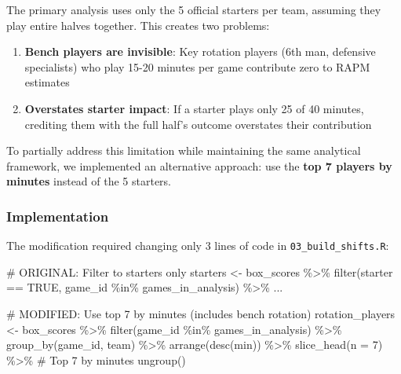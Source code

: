 \documentclass[
  letterpaper,
  DIV=11,
  numbers=noendperiod]{scrartcl}
\newenvironment{Shaded}{\begin{snugshade}}{\end{snugshade}}
\newcommand{\AttributeTok}[1]{\textcolor[rgb]{0.40,0.45,0.13}{#1}}
\newcommand{\CommentTok}[1]{\textcolor[rgb]{0.37,0.37,0.37}{#1}}
\newcommand{\ConstantTok}[1]{\textcolor[rgb]{0.56,0.35,0.01}{#1}}
\newcommand{\DecValTok}[1]{\textcolor[rgb]{0.68,0.00,0.00}{#1}}
\newcommand{\FunctionTok}[1]{\textcolor[rgb]{0.28,0.35,0.67}{#1}}
\newcommand{\NormalTok}[1]{\textcolor[rgb]{0.00,0.23,0.31}{#1}}
\newcommand{\OtherTok}[1]{\textcolor[rgb]{0.00,0.23,0.31}{#1}}
\newcommand{\SpecialCharTok}[1]{\textcolor[rgb]{0.37,0.37,0.37}{#1}}
\providecommand{\tightlist}{%
  \setlength{\itemsep}{0pt}\setlength{\parskip}{0pt}}
\begin{document}
The primary analysis uses only the 5 official starters per team,
assuming they play entire halves together. This creates two problems:

\begin{enumerate}
\def\labelenumi{\arabic{enumi}.}
\tightlist
\item
  \textbf{Bench players are invisible}: Key rotation players (6th man,
  defensive specialists) who play 15-20 minutes per game contribute zero
  to RAPM estimates
\item
  \textbf{Overstates starter impact}: If a starter plays only 25 of 40
  minutes, crediting them with the full half's outcome overstates their
  contribution
\end{enumerate}

To partially address this limitation while maintaining the same
analytical framework, we implemented an alternative approach: use the
\textbf{top 7 players by minutes} instead of the 5 starters.

\subsubsection{Implementation}\label{implementation}

The modification required changing only 3 lines of code in
\texttt{03\_build\_shifts.R}:

\begin{Shaded}
\begin{Highlighting}[]
\CommentTok{\# ORIGINAL: Filter to starters only}
\NormalTok{starters }\OtherTok{\textless{}{-}}\NormalTok{ box\_scores }\SpecialCharTok{\%\textgreater{}\%}
  \FunctionTok{filter}\NormalTok{(starter }\SpecialCharTok{==} \ConstantTok{TRUE}\NormalTok{, game\_id }\SpecialCharTok{\%in\%}\NormalTok{ games\_in\_analysis) }\SpecialCharTok{\%\textgreater{}\%}
\NormalTok{  ...}

\CommentTok{\# MODIFIED: Use top 7 by minutes (includes bench rotation)}
\NormalTok{rotation\_players }\OtherTok{\textless{}{-}}\NormalTok{ box\_scores }\SpecialCharTok{\%\textgreater{}\%}
  \FunctionTok{filter}\NormalTok{(game\_id }\SpecialCharTok{\%in\%}\NormalTok{ games\_in\_analysis) }\SpecialCharTok{\%\textgreater{}\%}
  \FunctionTok{group\_by}\NormalTok{(game\_id, team) }\SpecialCharTok{\%\textgreater{}\%}
  \FunctionTok{arrange}\NormalTok{(}\FunctionTok{desc}\NormalTok{(min)) }\SpecialCharTok{\%\textgreater{}\%}
  \FunctionTok{slice\_head}\NormalTok{(}\AttributeTok{n =} \DecValTok{7}\NormalTok{) }\SpecialCharTok{\%\textgreater{}\%}  \CommentTok{\# Top 7 by minutes}
  \FunctionTok{ungroup}\NormalTok{()}
\end{Highlighting}
\end{Shaded}
\end{document}
